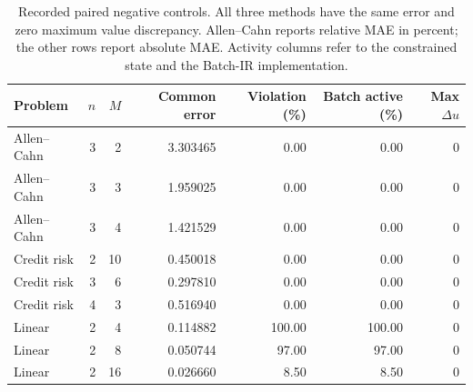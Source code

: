 \begin{table}[htbp]
\centering\small
\caption{Recorded paired negative controls. All three methods have the same error and zero maximum value discrepancy. Allen--Cahn reports relative MAE in percent; the other rows report absolute MAE. Activity columns refer to the constrained state and the Batch-IR implementation.}\label{tab:restored-negative}
\begin{tabular}{lrrrrrr}
\toprule
Problem & $n$ & $M$ & Common error & Violation (\%) & Batch active (\%) & Max $\Delta u$ \\
\midrule
Allen--Cahn & 3 & 2 & 3.303465 & 0.00 & 0.00 & 0 \\
Allen--Cahn & 3 & 3 & 1.959025 & 0.00 & 0.00 & 0 \\
Allen--Cahn & 3 & 4 & 1.421529 & 0.00 & 0.00 & 0 \\
\midrule
Credit risk & 2 & 10 & 0.450018 & 0.00 & 0.00 & 0 \\
Credit risk & 3 & 6 & 0.297810 & 0.00 & 0.00 & 0 \\
Credit risk & 4 & 3 & 0.516940 & 0.00 & 0.00 & 0 \\
\midrule
Linear & 2 & 4 & 0.114882 & 100.00 & 100.00 & 0 \\
Linear & 2 & 8 & 0.050744 & 97.00 & 97.00 & 0 \\
Linear & 2 & 16 & 0.026660 & 8.50 & 8.50 & 0 \\
\bottomrule
\end{tabular}
\end{table}
